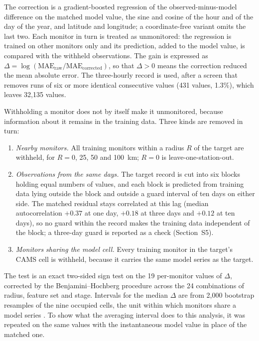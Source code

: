 The correction is a gradient-boosted regression \citep{friedman2001,pedregosa2011} of the
observed-minus-model difference on the matched model value, the sine and cosine of the hour and
of the day of the year, and latitude and longitude; a coordinate-free variant omits the last two.
Each monitor in turn is treated as unmonitored: the regression is trained on other monitors only
and its prediction, added to the model value, is compared with the withheld observations. The
gain is expressed as $\Delta=\log(\mathrm{MAE_{raw}}/\mathrm{MAE_{corrected}})$, so that
$\Delta>0$ means the correction reduced the mean absolute error. The three-hourly record is used,
after a screen that removes runs of six or more identical consecutive values (431 values, 1.3\%),
which leaves 32,135 values.

Withholding a monitor does not by itself make it unmonitored, because information about it
remains in the training data. Three kinds are removed in turn:
\begin{enumerate}
\item \emph{Nearby monitors.} All training monitors within a radius $R$ of the target are
      withheld, for $R=0$, 25, 50 and 100~km; $R=0$ is leave-one-station-out.
\item \emph{Observations from the same days.} The target record is cut into six blocks holding
      equal numbers of values, and each block is predicted from training data lying outside the
      block and outside a guard interval of ten days on either side. The matched residual stays
      correlated at this lag (median autocorrelation $+0.37$ at one day, $+0.18$ at three days
      and $+0.12$ at ten days), so no guard within the record makes the training data independent
      of the block; a three-day guard is reported as a check (Section~S5).
\item \emph{Monitors sharing the model cell.} Every training monitor in the target's CAMS cell
      is withheld, because it carries the same model series as the target.
\end{enumerate}
The test is an exact two-sided sign test on the 19 per-monitor values of $\Delta$, corrected by
the Benjamini--Hochberg procedure \citep{benjamini1995} across the 24 combinations of radius,
feature set and stage. Intervals for the median $\Delta$ are from 2,000 bootstrap resamples of
the nine occupied cells, the unit within which monitors share a model series \citep{efron1979}.
To show what the averaging interval does to this analysis, it was repeated on the same values
with the instantaneous model value in place of the matched one.

